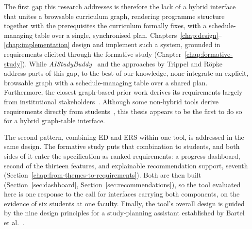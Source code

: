 The first gap this research addresses is therefore the lack of a hybrid interface that unites a browsable curriculum graph, rendering programme structure together with the prerequisites the curriculum formally fixes, with a schedule-managing table over a single, synchronised plan. Chapters~\ref{chap:design}--\ref{chap:implementation} design and implement such a system, grounded in requirements elicited through the formative study (Chapter~\ref{chap:formative-study}). While \emph{AIStudyBuddy}~\cite{roepke_study_2024, wagner_combined_2023, judel_supporting_2023} and the approaches by Trippel and Röpke~\cite{trippel_developing_2025} address parts of this gap, to the best of our knowledge, none integrate an explicit, browsable graph with a schedule-managing table over a shared plan. Furthermore, the closest graph-based prior work derives its requirements largely from institutional stakeholders~\cite{trippel_developing_2025}. Although some non-hybrid tools derive requirements directly from students~\cite{hirmer_requirements_2022, judel_supporting_2023}, this thesis appears to be the first to do so for a hybrid graph-table interface.

The second pattern, combining ED and ERS within one tool, is addressed in the same design. The formative study puts that combination to students, and both sides of it enter the specification as ranked requirements: a progress dashboard, second of the thirteen features, and explainable recommendation support, seventh (Section~\ref{chap:from-themes-to-requirements}). Both are then built (Section~\ref{sec:dashboard}, Section~\ref{sec:recommendations}), so the tool evaluated here is one response to the call for interfaces carrying both components, on the evidence of six students at one faculty. Finally, the tool's overall design is guided by the nine design principles for a study-planning assistant established by Bartel et al.~\cite{bartel_design_2024}.